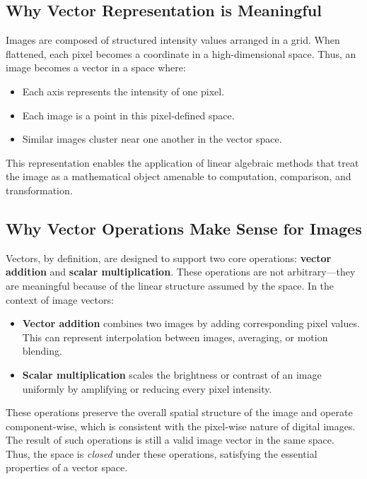 \subsection{Why Vector Representation is Meaningful}

Images are composed of structured intensity values arranged in a grid. When flattened, each pixel becomes a coordinate in a high-dimensional space. Thus, an image becomes a vector in a space where:
\begin{itemize}
	\item Each axis represents the intensity of one pixel.
	\item Each image is a point in this pixel-defined space.
	\item Similar images cluster near one another in the vector space.
\end{itemize}

This representation enables the application of linear algebraic methods that treat the image as a mathematical object amenable to computation, comparison, and transformation.

\subsection{Why Vector Operations Make Sense for Images}

Vectors, by definition, are designed to support two core operations: \textbf{vector addition} and \textbf{scalar multiplication}. These operations are not arbitrary—they are meaningful because of the linear structure assumed by the space. In the context of image vectors:

\begin{itemize}
	\item \textbf{Vector addition} combines two images by adding corresponding pixel values. This can represent interpolation between images, averaging, or motion blending.
	\item \textbf{Scalar multiplication} scales the brightness or contrast of an image uniformly by amplifying or reducing every pixel intensity.
\end{itemize}

These operations preserve the overall spatial structure of the image and operate component-wise, which is consistent with the pixel-wise nature of digital images. The result of such operations is still a valid image vector in the same space. Thus, the space is \emph{closed} under these operations, satisfying the essential properties of a vector space.


